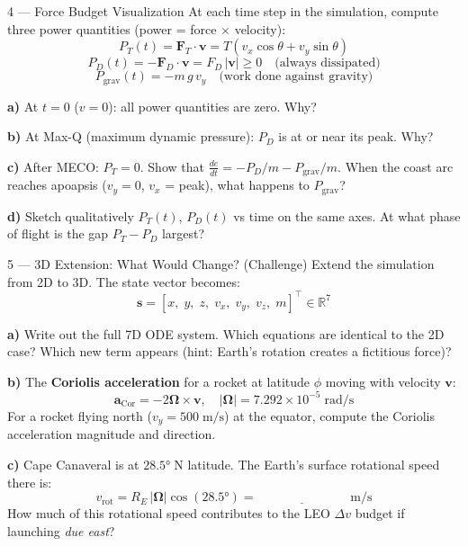 \documentclass[12pt, a4paper]{article}
\begin{document}
\begin{solutionspace}[9cm]
\end{solutionspace}

\begin{exercisebox}{4 — Force Budget Visualization}
At each time step in the simulation, compute three power quantities (power = force $\times$ velocity):
\[
  P_T(t) = \mathbf{F}_T \cdot \mathbf{v} = T(v_x\cos\theta + v_y\sin\theta)
\]
\[
  P_D(t) = -\mathbf{F}_D \cdot \mathbf{v} = F_D\,|\mathbf{v}| \geq 0 \quad \text{(always dissipated)}
\]
\[
  P_\text{grav}(t) = -m\,g\,v_y \quad \text{(work done against gravity)}
\]

\textbf{a)} At $t = 0$ ($v = 0$): all power quantities are zero. Why?

\textbf{b)} At Max-Q (maximum dynamic pressure): $P_D$ is at or near its peak. Why?

\textbf{c)} After MECO: $P_T = 0$. Show that $\frac{de}{dt} = -P_D/m - P_\text{grav}/m$.
When the coast arc reaches apoapsis ($v_y = 0$, $v_x$ = peak), what happens to $P_\text{grav}$?

\textbf{d)} Sketch qualitatively $P_T(t)$, $P_D(t)$ vs time on the same axes.
At what phase of flight is the gap $P_T - P_D$ largest?
\end{exercisebox}

\begin{solutionspace}[8cm]
\end{solutionspace}

\begin{exercisebox}{5 — 3D Extension: What Would Change? (Challenge)}
Extend the simulation from 2D to 3D. The state vector becomes:
\[
  \mathbf{s} = [x,\; y,\; z,\; v_x,\; v_y,\; v_z,\; m]^\top \in \mathbb{R}^7
\]

\textbf{a)} Write out the full 7D ODE system. Which equations are identical to the 2D case?
Which new term appears (hint: Earth's rotation creates a fictitious force)?

\textbf{b)} The \textbf{Coriolis acceleration} for a rocket at latitude $\phi$ moving with velocity $\mathbf{v}$:
\[
  \mathbf{a}_\text{Cor} = -2\boldsymbol{\Omega}\times\mathbf{v}, \quad |\boldsymbol{\Omega}| = 7.292\times 10^{-5}\;\text{rad/s}
\]
For a rocket flying north ($v_y = 500\;\text{m/s}$) at the equator, compute the Coriolis acceleration magnitude and direction.

\textbf{c)} Cape Canaveral is at $28.5°\;\text{N}$ latitude. The Earth's surface rotational speed there is:
\[
  v_\text{rot} = R_E\,|\boldsymbol{\Omega}|\cos(28.5°) = \underline{\hspace{3cm}}\;\text{m/s}
\]
How much of this rotational speed contributes to the LEO $\Delta v$ budget if launching \textit{due east}?
\end{exercisebox}
\end{document}
